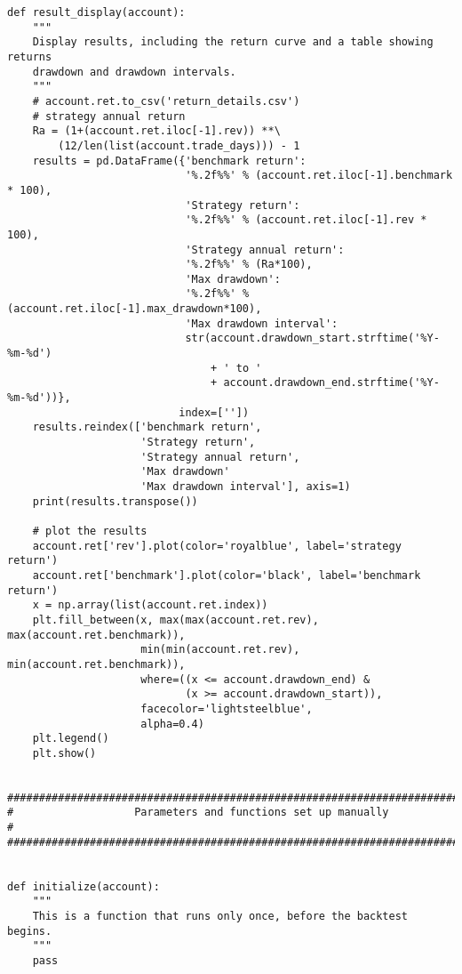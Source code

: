 \documentclass[11pt]{article}
\begin{document}
\begin{lstlisting}
def result_display(account):
    """
    Display results, including the return curve and a table showing returns
    drawdown and drawdown intervals.
    """
    # account.ret.to_csv('return_details.csv')
    # strategy annual return
    Ra = (1+(account.ret.iloc[-1].rev)) **\
        (12/len(list(account.trade_days))) - 1
    results = pd.DataFrame({'benchmark return':
                            '%.2f%%' % (account.ret.iloc[-1].benchmark * 100),
                            'Strategy return':
                            '%.2f%%' % (account.ret.iloc[-1].rev * 100),
                            'Strategy annual return':
                            '%.2f%%' % (Ra*100),
                            'Max drawdown':
                            '%.2f%%' % (account.ret.iloc[-1].max_drawdown*100),
                            'Max drawdown interval':
                            str(account.drawdown_start.strftime('%Y-%m-%d')
                                + ' to '
                                + account.drawdown_end.strftime('%Y-%m-%d'))},
                           index=[''])
    results.reindex(['benchmark return',
                     'Strategy return',
                     'Strategy annual return',
                     'Max drawdown'
                     'Max drawdown interval'], axis=1)
    print(results.transpose())

    # plot the results
    account.ret['rev'].plot(color='royalblue', label='strategy return')
    account.ret['benchmark'].plot(color='black', label='benchmark return')
    x = np.array(list(account.ret.index))
    plt.fill_between(x, max(max(account.ret.rev), max(account.ret.benchmark)),
                     min(min(account.ret.rev), min(account.ret.benchmark)),
                     where=((x <= account.drawdown_end) &
                            (x >= account.drawdown_start)),
                     facecolor='lightsteelblue',
                     alpha=0.4)
    plt.legend()
    plt.show()


###############################################################################
#                   Parameters and functions set up manually                  #
###############################################################################


def initialize(account):
    """
    This is a function that runs only once, before the backtest begins.
    """
    pass



\end{lstlisting}
\end{document}
